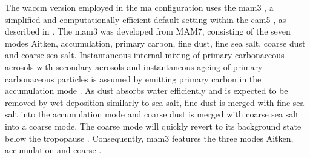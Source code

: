 \documentclass{ametsocV6.1}
\begin{document}
The \gls{waccm} version employed in the \gls{ma} configuration uses the \gls{mam3}
\citep{gettleman2019}, a simplified and computationally efficient default setting within
the \gls{cam5} \citep{liu2016}, as described in \citet{liu2012}. The \gls{mam3} was
developed from MAM7, consisting of the seven modes Aitken, accumulation, primary carbon,
fine dust, fine sea salt, coarse dust and coarse sea salt. Instantaneous internal mixing
of primary carbonaceous aerosols with secondary aerosols and instantaneous ageing of
primary carbonaceous particles is assumed by emitting primary carbon in the accumulation
mode \citep{liu2016}. 
As dust absorbs water efficiently and is expected to be removed by wet deposition similarly to sea salt, fine dust is merged with fine sea salt into the accumulation mode and coarse dust is merged with coarse sea salt into a coarse mode. 
The coarse mode will quickly revert to its background state below the tropopause \citep{liu2012}. Consequently, \gls{mam3} features the three modes
Aitken, accumulation and coarse \citep{liu2016}.
\end{document}
